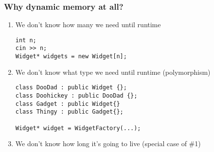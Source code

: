 
\begin{frame}[fragile,t]
\frametitle{Why dynamic memory at all?}
\pause{}

\begin{enumerate}
\item We don't know how many we need until runtime
{\scriptsize \begin{verbatim}
int n;
cin >> n;
Widget* widgets = new Widget[n];
\end{verbatim}
}
\pause{}
\item We don't know what type we need until runtime (polymorphism)
{\scriptsize \begin{verbatim}
class DooDad : public Widget {};
class Doohickey : public DooDad {};
class Gadget : public Widget{}
class Thingy : public Gadget{};

Widget* widget = WidgetFactory(...);
\end{verbatim}
}
\pause{}
\item We don't know how long it's going to live (special case of \#1)
\end{enumerate}

\vskip 12pt
\pause{}

\end{frame}

